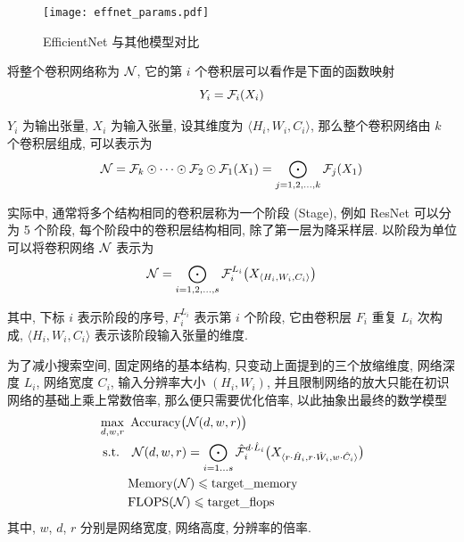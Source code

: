 \documentclass[12pt]{article}
\begin{document}
\begin{figure}[htbp]
  \centering
  \texttt{[image: effnet\_params.pdf]}
  \caption{EfficientNet 与其他模型对比}
  \label{fig:effnet_params}
\end{figure}

将整个卷积网络称为 $\mathcal{N}$, 它的第 $i$ 个卷积层可以看作是下面的函数映射
\begin{equation}
  Y_i = \mathcal{F}_i(X_i)
\end{equation}

$Y_i$ 为输出张量, $X_i$ 为输入张量, 设其维度为 $\langle H_i, W_i, C_i \rangle$, 那么整个卷积网络由 $k$ 个卷积层组成, 可以表示为
\begin{equation}
  \mathcal{N} = \mathcal{F}_k \odot \dots \odot  \mathcal{F}_2 \odot \mathcal{F}_1 (X_1) = \bigodot_{j=1,2,\dots,k} \mathcal{F}_j (X_1)
\end{equation}

实际中, 通常将多个结构相同的卷积层称为一个阶段 (Stage), 例如 ResNet 可以分为 5 个阶段, 每个阶段中的卷积层结构相同, 除了第一层为降采样层. 以阶段为单位可以将卷积网络 $\mathcal{N}$ 表示为
\begin{equation}
  \mathcal{N} = \bigodot_{i=1,2,\dots,s} \mathcal{F}_{i}^{L_i} \big(X_{\langle H_i, W_i, C_i \rangle}\big)
\end{equation}

其中, 下标 $i$ 表示阶段的序号, $F^{L_i}_i$ 表示第 $i$ 个阶段, 它由卷积层 $F_i$ 重复 $L_i$ 次构成, $\langle H_i, W_i, C_i \rangle$ 表示该阶段输入张量的维度. 

为了减小搜索空间, 固定网络的基本结构, 只变动上面提到的三个放缩维度, 网络深度 $L_i$, 网络宽度 $C_i$, 输入分辨率大小 $(H_i, W_i)$, 并且限制网络的放大只能在初识网络的基础上乘上常数倍率, 那么便只需要优化倍率, 以此抽象出最终的数学模型
\begin{equation}
  \begin{aligned}    
    &\max_{d, w, r}~\text{Accuracy} \big(\mathcal{N}(d, w, r)\big) \\
    &~\text{s.t.}\quad \mathcal{N}(d, w, r) = \bigodot_{i=1...s} \hat{\mathcal{F}}_{i}^{d\cdot \hat  L_i} \big(X_{ \langle r\cdot  \hat H_i, r\cdot  \hat W_i, w\cdot  \hat C_i \rangle}\big) \\
    &\qquad~\text{Memory}(\mathcal{N}) \leqslant \text{target\_memory}  \\
    &\qquad~\text{FLOPS}(\mathcal{N}) \leqslant \text{target\_flops}   \\
  \end{aligned}    
\end{equation}
其中, $w$, $d$, $r$ 分别是网络宽度, 网络高度, 分辨率的倍率. 
\end{document}
